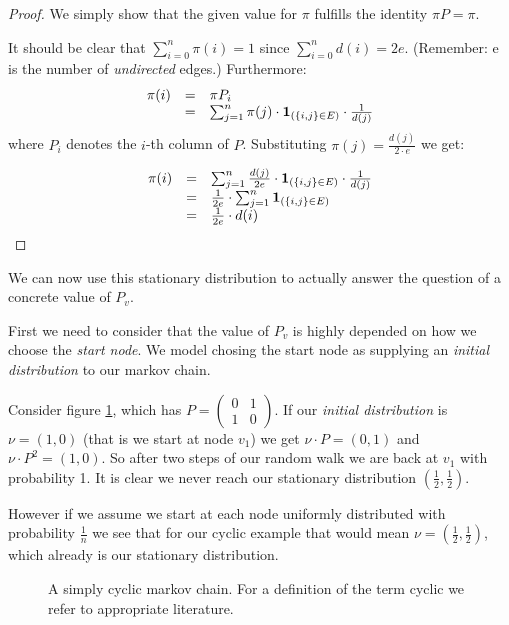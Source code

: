 \begin{proof}
We simply show that the given value for $\pi$ fulfills the identity $\pi P = \pi$.

It should be clear that $\sum_{i=0}^{n} \pi(i) = 1$ since $\sum_{i=0}^{n} d(i) = 2e$.
(Remember: e is the number of {\em undirected} edges.)
Furthermore:
$$
\begin{array}{rcl}
\pi(i) & = & \pi P_i \\
       & = & \sum_{j=1}^{n} \pi(j) \cdot \text{\textbf{1}}_{(\{i, j\} \in E)} \cdot \frac{1}{d(j)} \\
\end{array}
$$
where $P_i$ denotes the $i$-th column of $P$.
Substituting $\pi(j) = \frac{d(j)}{2 \cdot e}$ we get:

$$
\begin{array}{rcl}
\pi(i) & = & \sum_{j=1}^{n} \frac{d(j)}{2e} \cdot \text{\textbf{1}}_{(\{i, j\} \in E)} \cdot \frac{1}{d(j)} \\
       & = & \frac{1}{2e} \cdot \sum_{j=1}^{n} \text{\textbf{1}}_{(\{i, j\} \in E)} \\
       & = & \frac{1}{2e} \cdot d(i)
\end{array}
$$
\end{proof}

We can now use this stationary distribution to actually answer the
question of a concrete value of $P_v$.

First we need to consider that the value of $P_v$ is highly depended on
how we choose the \emph{start node}. We model chosing the start node as
supplying an \emph{initial distribution} to our markov chain.

Consider figure \ref{cyclic-graph}, which has
$P = \left(\begin{matrix}0 & 1\\ 1 & 0\end{matrix}\right)$. If our
\emph{initial distribution} is $\nu = (1, 0)$ (that is we start at node
$v_1$) we get $\nu \cdot P = (0, 1)$ and $\nu \cdot P^2 = (1, 0)$. So
after two steps of our random walk we are back at $v_1$ with probability
1. It is clear we never reach our stationary distribution
$(\frac{1}{2}, \frac{1}{2})$.

However if we assume we start at each node uniformly distributed with
probability $\frac{1}{n}$ we see that for our cyclic example that would
mean $\nu = (\frac{1}{2}, \frac{1}{2})$, which already is our stationary
distribution.

\begin{figure}
\caption{A simply cyclic markov chain. For a definition of the term cyclic we refer to appropriate literature.}
\label{cyclic-graph}
\end{figure}

